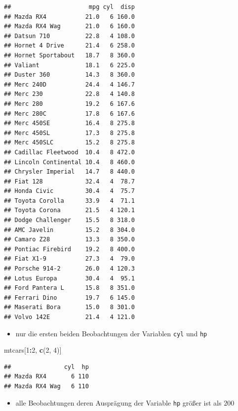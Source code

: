 \documentclass[12pt,a4paper]{article}
\newenvironment{Shaded}{\begin{snugshade}}{\end{snugshade}}
\newcommand{\DecValTok}[1]{\textcolor[rgb]{0.00,0.00,0.81}{#1}}
\newcommand{\FunctionTok}[1]{\textcolor[rgb]{0.13,0.29,0.53}{\textbf{#1}}}
\newcommand{\NormalTok}[1]{#1}
\newcommand{\SpecialCharTok}[1]{\textcolor[rgb]{0.81,0.36,0.00}{\textbf{#1}}}
\begin{document}
\begin{verbatim}
##                      mpg cyl  disp
## Mazda RX4           21.0   6 160.0
## Mazda RX4 Wag       21.0   6 160.0
## Datsun 710          22.8   4 108.0
## Hornet 4 Drive      21.4   6 258.0
## Hornet Sportabout   18.7   8 360.0
## Valiant             18.1   6 225.0
## Duster 360          14.3   8 360.0
## Merc 240D           24.4   4 146.7
## Merc 230            22.8   4 140.8
## Merc 280            19.2   6 167.6
## Merc 280C           17.8   6 167.6
## Merc 450SE          16.4   8 275.8
## Merc 450SL          17.3   8 275.8
## Merc 450SLC         15.2   8 275.8
## Cadillac Fleetwood  10.4   8 472.0
## Lincoln Continental 10.4   8 460.0
## Chrysler Imperial   14.7   8 440.0
## Fiat 128            32.4   4  78.7
## Honda Civic         30.4   4  75.7
## Toyota Corolla      33.9   4  71.1
## Toyota Corona       21.5   4 120.1
## Dodge Challenger    15.5   8 318.0
## AMC Javelin         15.2   8 304.0
## Camaro Z28          13.3   8 350.0
## Pontiac Firebird    19.2   8 400.0
## Fiat X1-9           27.3   4  79.0
## Porsche 914-2       26.0   4 120.3
## Lotus Europa        30.4   4  95.1
## Ford Pantera L      15.8   8 351.0
## Ferrari Dino        19.7   6 145.0
## Maserati Bora       15.0   8 301.0
## Volvo 142E          21.4   4 121.0
\end{verbatim}

\begin{itemize}
  \item nur die ersten beiden Beobachtungen der Variablen \texttt{cyl} und \texttt{hp}
\end{itemize}

\begin{Shaded}
\begin{Highlighting}[]
\NormalTok{    mtcars[}\DecValTok{1}\SpecialCharTok{:}\DecValTok{2}\NormalTok{, }\FunctionTok{c}\NormalTok{(}\DecValTok{2}\NormalTok{, }\DecValTok{4}\NormalTok{)]}
\end{Highlighting}
\end{Shaded}

\begin{verbatim}
##               cyl  hp
## Mazda RX4       6 110
## Mazda RX4 Wag   6 110
\end{verbatim}

\begin{itemize}
  \item alle Beobachtungen deren Ausprägung der Variable \texttt{hp} größer ist als $200$
\end{itemize}
\end{document}
